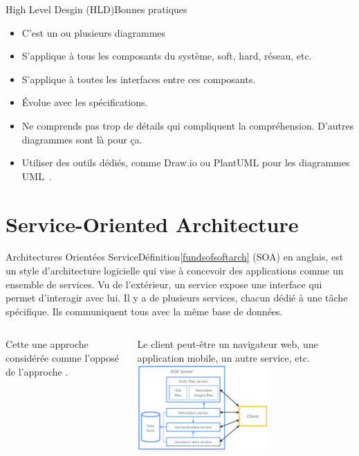 \documentclass{beamer}
\begin{document}
    \begin{frame}{High Level Desgin (HLD)}{Bonnes pratiques}
        \begin{itemize}
            \item C'est un ou plusieurs diagrammes
            \item S'applique à tous les composants du système, soft, hard, réseau, etc.
            \item S'applique à toutes les interfaces entre ces composants.
            \item Évolue avec les spécifications.
            \item Ne comprends pas trop de détails qui compliquent la compréhension.
            D'autres diagrammes sont là pour ça.
            \item Utiliser des outils dédiés, comme Draw.io ou PlantUML pour les diagrammes UML~.
        \end{itemize}
    \end{frame}


    \section{Service-Oriented Architecture}\label{sec:soa}

    \begin{frame}{Architectures Orientées Service}{Définition\cref{fundsofsoftarch}}
         (SOA) en anglais, est un style d'architecture logicielle qui vise à concevoir des applications comme un ensemble de services.
        \bigbreak
        Vu de l'extérieur, un service expose une interface qui permet d'interagir avec lui.
        Il y a de plusieurs services, chacun dédié à une tâche spécifique.
        Ils communiquent tous avec la même base de données.
        \begin{columns}
            Cette une approche considérée comme l'opposé de l'approche .

            Le client peut-être un navigateur web, une application mobile, un autre service, etc.
            \centering
            \includegraphics[width=5cm]{image/soa-server}
        \end{columns}
    \end{frame}
\end{document}
